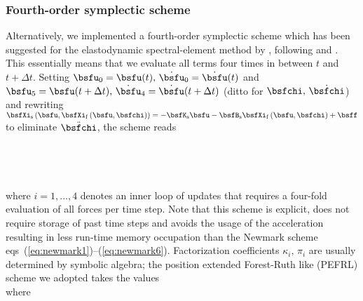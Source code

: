 \subsubsection{Fourth-order symplectic scheme} \label{section:symplectic}
%
Alternatively, we implemented a fourth-order symplectic 
scheme which has been suggested for the elastodynamic 
spectral-element method by \citet{Ampuero+:07}, following
\citet[][eq.~(22)]{omelyan+:02} and \citet{omelyan+:03}.
This essentially means that we evaluate all terms four 
times in between $t$ and $t+\Delta{t}$.
Setting $\bsfu_0=\bsfu(t),\,\dot{\bsfu}_0=\dot{\bsfu}(t)$ and 
$\bsfu_5=\bsfu(t+\Delta t),\,\dot{\bsfu}_4=\dot{\bsfu}(t+ \Delta t)$
(ditto for $\bsfchi,\,\dot{\bsfchi}$) and rewriting
$\bsfXi_{\rm s}\left(\bsfu,\bsfXi_{\rm f}\left(\bsfu,\bsfchi\right)\right)=
-\bsfK_{\rm s}\bsfu-\bsfB_{\rm s}
\bsfXi_{\rm f}\left(\bsfu,\bsfchi\right)
+\bsff$ to eliminate $\ddot{\bsfchi}$, the scheme reads
%
\eqa \label{eq:pefrl}
\\
\\
\\
\\
\\
\ena
%
where $i=1,...,4$ denotes an inner loop of updates that requires a four-fold
evaluation of all forces per time step. Note that this scheme is explicit, 
does not require storage of past time steps and avoids the usage of the 
acceleration resulting in less run-time memory occupation than the Newmark 
scheme eqs~(\ref{eq:newmark1})--(\ref{eq:newmark6}). 
Factorization coefficients $\kappa_i,\,\pi_i$ are usually determined 
by symbolic algebra; the position extended Forest-Ruth like 
(PEFRL) scheme we adopted takes the values
%
\eqa
{}\\
\ena
%
where
\eqa
{}\\ 
\\

